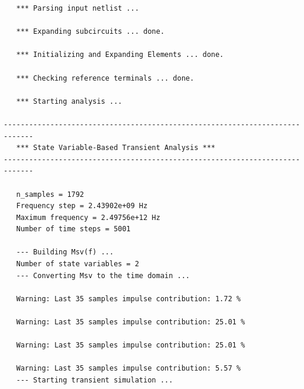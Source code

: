 \documentclass{article}
\begin{document}
{\begin{verbatim}
   *** Parsing input netlist ...

   *** Expanding subcircuits ... done.

   *** Initializing and Expanding Elements ... done.

   *** Checking reference terminals ... done.

   *** Starting analysis ...

-----------------------------------------------------------------------------
   *** State Variable-Based Transient Analysis ***
-----------------------------------------------------------------------------

   n_samples = 1792
   Frequency step = 2.43902e+09 Hz
   Maximum frequency = 2.49756e+12 Hz
   Number of time steps = 5001

   --- Building Msv(f) ...
   Number of state variables = 2
   --- Converting Msv to the time domain ...

   Warning: Last 35 samples impulse contribution: 1.72 %

   Warning: Last 35 samples impulse contribution: 25.01 %

   Warning: Last 35 samples impulse contribution: 25.01 %

   Warning: Last 35 samples impulse contribution: 5.57 %
   --- Starting transient simulation ...


\end{verbatim}}
\end{document}
